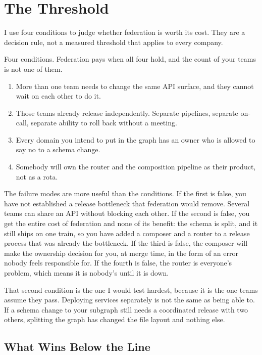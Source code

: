 \section{The Threshold}
\label{sec:ch01-the-threshold}

%
I use four conditions to judge whether federation is worth its cost. They
are a decision rule, not a measured threshold that applies to every company.

Four conditions. Federation pays when all four hold, and the count of your
teams is not one of them.

\begin{enumerate}[topsep=4pt, itemsep=3pt]
  \item More than one team needs to change the same API surface, and they
        cannot wait on each other to do it.
  \item Those teams already release independently. Separate pipelines,
        separate on-call, separate ability to roll back without a meeting.
  \item Every domain you intend to put in the graph has an owner who is
        allowed to say no to a schema change.
  \item Somebody will own the router and the composition pipeline as their
        product, not as a rota.
\end{enumerate}

The failure modes are more useful than the conditions. If the first is false,
you have not established a release bottleneck that federation would remove.
Several teams can share an API without blocking each other. If the second is
false, you get the entire cost of
federation and none of its benefit: the schema is split, and it still ships on
one train, so you have added a composer and a router to a release process that
was already the bottleneck. If the third is false, the composer will make the
ownership decision for you, at merge time, in the form of an error nobody feels
responsible for. If the fourth is false, the router is everyone's problem,
which means it is nobody's until it is down.

That second condition is the one I would test hardest, because it is the one
teams assume they pass. Deploying services separately is not the same as being
able to. If a schema change to your subgraph still needs a coordinated release
with two others, splitting the graph has changed the file layout and nothing
else.
%

\subsection{What Wins Below the Line}
\label{sec:ch01-what-wins-below-the-line}

